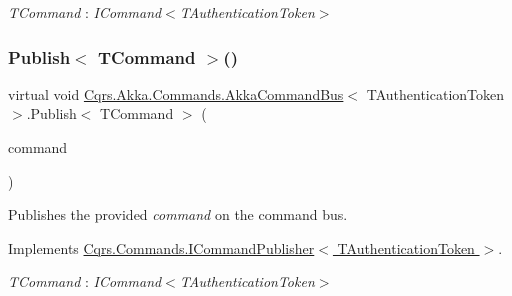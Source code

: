 \begin{Desc}
\item[Type Constraints]\begin{description}
\item[{\em T\+Command} : {\em I\+Command$<$T\+Authentication\+Token$>$}]\end{description}
\end{Desc}
\mbox{\label{classCqrs_1_1Akka_1_1Commands_1_1AkkaCommandBus_a48e1d46035b1e1a3251636b8a03f7dae_a48e1d46035b1e1a3251636b8a03f7dae}} 
\subsubsection{\texorpdfstring{Publish$<$ T\+Command $>$()}{Publish< TCommand >()}\hspace{0.1cm}{\footnotesize\ttfamily [1/2]}}
{\footnotesize\ttfamily virtual void \hyperlink{classCqrs_1_1Akka_1_1Commands_1_1AkkaCommandBus}{Cqrs.\+Akka.\+Commands.\+Akka\+Command\+Bus}$<$ T\+Authentication\+Token $>$.Publish$<$ T\+Command $>$ (\begin{DoxyParamCaption}\item[{T\+Command}]{command }\end{DoxyParamCaption})\hspace{0.3cm}{\ttfamily [virtual]}}



Publishes the provided {\itshape command}  on the command bus. 



Implements \hyperlink{interfaceCqrs_1_1Commands_1_1ICommandPublisher_aeeb487ad5686d9c44d214b1daaf7833a_aeeb487ad5686d9c44d214b1daaf7833a}{Cqrs.\+Commands.\+I\+Command\+Publisher$<$ T\+Authentication\+Token $>$}.

\begin{Desc}
\item[Type Constraints]\begin{description}
\item[{\em T\+Command} : {\em I\+Command$<$T\+Authentication\+Token$>$}]\end{description}
\end{Desc}
\mbox{\label{classCqrs_1_1Akka_1_1Commands_1_1AkkaCommandBus_ab52365375febd74ac078e97af6e6cd24_ab52365375febd74ac078e97af6e6cd24}} 
